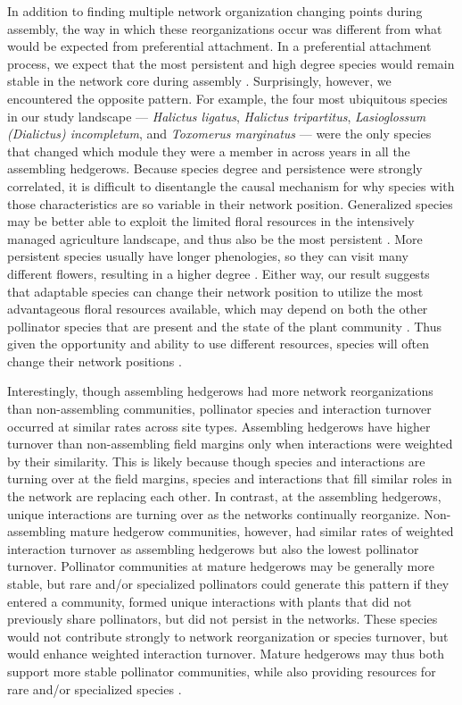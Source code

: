 \documentclass[12pt]{article}
\begin{document}
In addition to finding multiple network organization changing points
during assembly, the way in which these reorganizations occur was
different from what would be expected from preferential attachment. In
a preferential attachment process, we expect that the most persistent
and high degree species would remain stable in the network core during
assembly \citep{barabasi1999emergence}. Surprisingly, however, we
encountered the opposite pattern. For example, the four most
ubiquitous species in our study landscape --- \textit{Halictus
  ligatus}, \textit{Halictus tripartitus}, \textit{Lasioglossum
  (Dialictus) incompletum}, and \textit{Toxomerus marginatus} --- were
the only species that changed which module they were a member in
across years in all the assembling hedgerows. Because species degree
and persistence were strongly correlated, it is difficult to
disentangle the causal mechanism for why species with those
characteristics are so variable in their network position. Generalized
species may be better able to exploit the limited floral resources in
the intensively managed agriculture landscape, and thus also be the
most persistent \citep[in ant-plant mutualisms,
][]{diaz2010changes}. More persistent species usually have longer
phenologies, so they can visit many different flowers, resulting in a
higher degree \citep{Vazquez2009, fort2016abundance}. Either way, our
result suggests that adaptable species can change their network
position to utilize the most advantageous floral resources available,
which may depend on both the other pollinator species that are present
and the state of the plant community \citep{macleod2016measuring,
  gomez2006ecological, Waser1996}. Thus given the opportunity and
ability to use different resources, species will often change their
network positions \citep{macleod2016measuring}.

Interestingly, though assembling hedgerows had more network
reorganizations than non-assembling communities, pollinator species
and interaction turnover occurred at similar rates across site types.
Assembling hedgerows have higher turnover than non-assembling field
margins only when interactions were weighted by their similarity. This
is likely because though species and interactions are turning over at
the field margins, species and interactions that fill similar roles in
the network are replacing each other. In contrast, at the assembling
hedgerows, unique interactions are turning over as the networks
continually reorganize. Non-assembling mature hedgerow communities,
however, had similar rates of weighted interaction turnover as
assembling hedgerows but also the lowest pollinator
turnover. Pollinator communities at mature hedgerows may be generally
more stable, but rare and/or specialized pollinators could generate
this pattern if they entered a community, formed unique interactions
with plants that did not previously share pollinators, but did not
persist in the networks. These species would not contribute strongly
to network reorganization or species turnover, but would enhance
weighted interaction turnover. Mature hedgerows may thus both support
more stable pollinator communities, while also providing resources for
rare and/or specialized species \citep{kremen-2015-602,
  mgonigle-2015-x}.
\end{document}
